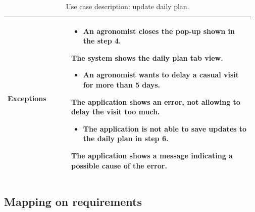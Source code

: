 \begin{table}[H]
\begin{tabular}{@{}p{0.25\linewidth} p{0.72\linewidth}@{}}
		\textbf{Exceptions}         & \begin{itemize}[leftmargin=.4cm,noitemsep,topsep=0pt,before=\vspace{-3mm}]
		   \item An agronomist closes the pop-up shown in the step 4.
		\end{itemize}
	    The system shows the daily plan tab view. \begin{itemize}[leftmargin=.4cm,noitemsep,topsep=0pt]
		   \item An agronomist wants to delay a casual visit for more than 5 days.
		\end{itemize}
		The application shows an error, not allowing to delay the visit too much.
	    \begin{itemize}[leftmargin=.4cm,noitemsep,topsep=0pt]
		   \item The application is not able to save updates to the daily plan in step 6. 
		\end{itemize}
		The application shows a message indicating a possible cause of the error.
		\\\bottomrule
	\end{tabular}
	\caption{Use case description: update daily plan.} 
\end{table}


\subsection{Mapping on requirements}

